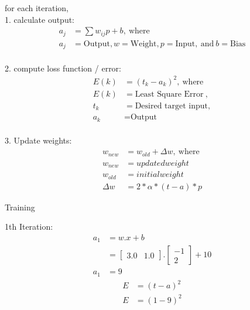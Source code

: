 \documentclass{article}
\begin{document}
	for each iteration, 
	\\ 1. calculate output:
	\begin{align*}
		a_j & = \sum w_{ij} p + b,~\text{where}\\
		a_j & = \text{Output}, w = \text{Weight}, p = \text{Input},~\text{and}~b = \text{Bias}
	\end{align*}
	\\ 2. compute loss function / error:
	\begin{align*}
		E(k) & = (t_k - a_k)^2,~\text{where} \\
		E(k) & = \text{Least Square Error}~, \\
		t_k & = \text{Desired target input}, \\
		a_k & = \text{Output}
	\end{align*}
	\\ 3. Update weights:
	\begin{align*}
		w_{new} & = w_{old} + \Delta w, ~\text{where} \\
		w_{new} & = updated weight \\
		w_{old} & = initial weight \\
		\Delta w & = 2 * \alpha * (t - a) * p
	\end{align*}
	\begin{center}
		\Large Training \\
	\end{center}
	1th Iteration: \\
	\begin{equation}
	\begin{split}
		a_1 & = w.x+b \\
		& = \begin{bmatrix}
			3.0 & 1.0
		\end{bmatrix}. \begin{bmatrix}
		-1 \\ 2
	\end{bmatrix} + 10 \\
	a_1 & = 9
	\end{split}
	\end{equation}
	\begin{equation}
	\begin{split}
	  E & = (t - a)^2 \\
	  E & = (1 - 9)^2 \\
	  
	\end{split}
	\end{equation}
	
\end{document}
